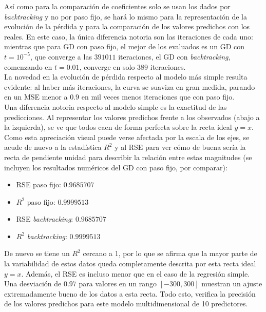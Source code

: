 \documentclass[11pt]{opticajnl}
\begin{document}
Así como para la comparación de coeficientes solo se usan los dados por \textit{backtracking} y no por paso fijo, se hará lo mismo para la representación de la evolución de la pérdida y para la comparación de los valores predichos con los reales. En este caso, la única diferencia notoria son las iteraciones de cada uno: mientras que para GD con paso fijo, el mejor de los evaluados es un GD con $t = 10^{-5}$, que converge a las $391011$ iteraciones, el GD con \textit{backtracking}, comenzando en $t=0.01$, converge en solo $389$ iteraciones. \\

La novedad en la evolución de pérdida respecto al modelo más simple resulta evidente: al haber más iteraciones, la curva se suaviza en gran medida, parando en un MSE menor a $0.9$ en mil veces menos iteraciones que con paso fijo. \\

Una diferencia notoria respecto al modelo simple es la exactitud de las predicciones. Al representar los valores predichos frente a los observados (abajo a la izquierda), se ve que todos caen de forma perfecta sobre la recta ideal $y=x$. Como esta apreciación visual puede verse afectada por la escala de los ejes, se acude de nuevo a la estadística $R^2$ y al RSE para ver cómo de buena sería la recta de pendiente unidad para describir la relación entre estas magnitudes (se incluyen los resultados numéricos del GD con paso fijo, por comparar):
\begin{multicols}{2}
\begin{itemize}
\item RSE paso fijo: $0.9685707$ 
\item $R^2$ paso fijo: $0.9999513$ 
\item RSE \textit{backtracking}: $0.9685707$
\item $R^2$ \textit{backtracking}: $0.9999513$
\end{itemize}
\end{multicols}

De nuevo se tiene un $R^2$ cercano a 1, por lo que se afirma que la mayor parte de la variabilidad de estos datos queda completamente descrita por esta recta ideal $y=x$. Además, el RSE es incluso menor que en el caso de la regresión simple. Una desviación de $0.97$ para valores en un rango $[-300, 300]$ muestran un ajuste extremadamente bueno de los datos a esta recta. Todo esto, verifica la precisión de los valores predichos para este modelo multidimensional de 10 predictores.
\end{document}
